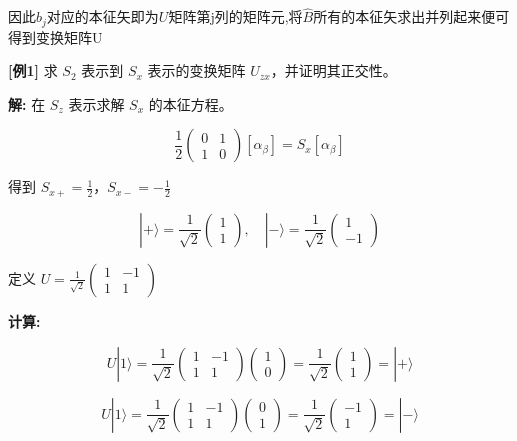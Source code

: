 \documentclass[lang=cn,15pt]{elegantbook}
\begin{document}
\begin{enumerate}
	因此$b_j$对应的本征矢即为$U$矩阵第j列的矩阵元,将$\hat{B}$所有的本征矢求出并列起来便可得到变换矩阵U
	
	\textbf{[例1]} 求 $S_2$ 表示到 $S_x$ 表示的变换矩阵 $U_{zx}$，并证明其正交性。
	
	\textbf{解:} 在 $S_z$ 表示求解 $S_x$ 的本征方程。
	
	\[
	\frac{1}{2} \begin{pmatrix} 0 & 1 \\ 1 & 0 \end{pmatrix} \left[ \alpha_\beta \right] = S_x \left[ \alpha_\beta \right]
	\]
	
	得到 $S_{x+} = \frac{1}{2}$，$S_{x-} = -\frac{1}{2}$
	
	\[
	| + \rangle = \frac{1}{\sqrt{2}} \begin{pmatrix} 1 \\ 1 \end{pmatrix}, \quad | - \rangle = \frac{1}{\sqrt{2}} \begin{pmatrix} 1 \\ -1 \end{pmatrix}
	\]
	
	定义 $U = \frac{1}{\sqrt{2}} \begin{pmatrix} 1 & -1 \\ 1 & 1 \end{pmatrix}$
	
	\textbf{计算:}
	
	\[
	U | 1 \rangle = \frac{1}{\sqrt{2}} \begin{pmatrix} 1 & -1 \\ 1 & 1 \end{pmatrix} \begin{pmatrix} 1 \\ 0 \end{pmatrix} = \frac{1}{\sqrt{2}} \begin{pmatrix} 1 \\ 1 \end{pmatrix} = | + \rangle
	\]
	
	\[
	U | 1 \rangle = \frac{1}{\sqrt{2}} \begin{pmatrix} 1 & -1 \\ 1 & 1 \end{pmatrix} \begin{pmatrix} 0 \\ 1 \end{pmatrix} = \frac{1}{\sqrt{2}} \begin{pmatrix} -1 \\ 1 \end{pmatrix} = | - \rangle
	\]
	

\end{enumerate}
\end{document}

